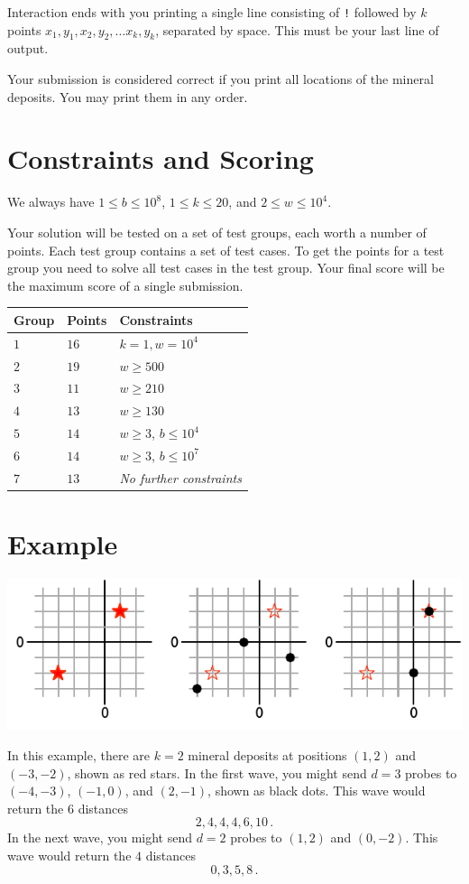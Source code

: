 Interaction ends with you printing a single line consisting of \texttt{!} followed by $k$ points $x_1, y_1, x_2, y_2, \ldots x_k, y_k$, separated by space.
This must be your last line of output.

Your submission is considered correct if you print all locations of the mineral deposits.
You may print them in any order.

\section*{Constraints and Scoring}

We always have 
$1\leq b \leq 10^8$, %
$1 \leq k \leq 20$, %
and
$2 \le w \le 10^4$. %

Your solution will be tested on a set of test groups, each worth a number of points.
Each test group contains a set of test cases.
To get the points for a test group you need to solve all test cases in the test group.
Your final score will be the maximum score of a single submission.

\medskip
\begin{tabular}{lll}
Group & Points & Constraints \\\hline
  $1$ & $16$ & $k = 1, w = 10^4$\\
  $2$ & $19$ & $w \ge 500$\\
  $3$ & $11$ & $w \ge 210$\\
  $4$ & $13$ & $w \ge 130$\\
  $5$ & $14$ & $w \ge 3$, $b \le 10^4$\\
  $6$ & $14$ & $w \ge 3$, $b \le 10^7$\\
  $7$ & $13$ & \emph{No further constraints}
\end{tabular}

\section*{Example}

\includegraphics[width=.6\textwidth]{img/sample1.pdf}

In this example, there are $k=2$ mineral deposits at positions $(1,2)$ and $(-3,-2)$, shown as red stars.
In the first wave, you might send $d=3$ probes to $(-4,-3)$, $(-1, 0)$, and $(2,-1)$, shown as black dots.
This wave would return the $6$ distances \[
  2, 4, 4, 4, 6, 10\,.
\]
In the next wave, you might send $d=2$ probes to $(1,2)$ and $(0,-2)$.
This wave would return the $4$ distances \[
  0, 3, 5, 8\,.
\]
